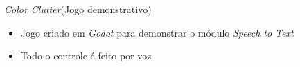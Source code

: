 \begin{frame}{\textit{Color Clutter}}{(Jogo demonstrativo)}

\begin{itemize}
\item Jogo criado em \textit{Godot} para demonstrar o módulo \textit{Speech to Text}
\item Todo o controle é feito por voz
\end{itemize}

\end{frame}
